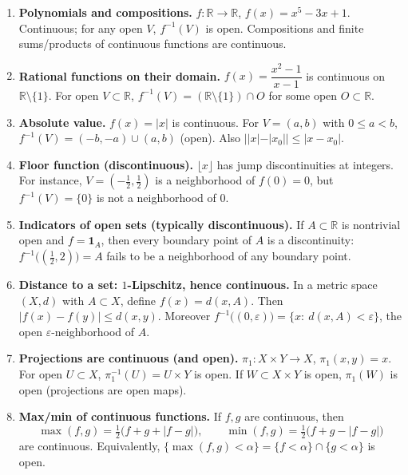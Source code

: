 \documentclass[12pt,a4paper]{article}
\begin{document}
\begin{enumerate}
	\item \textbf{Polynomials and compositions.}
	$f:\mathbb{R}\to\mathbb{R}$, $f(x)=x^5-3x+1$. Continuous; for any open $V$, $f^{-1}(V)$ is open.
	Compositions and finite sums/products of continuous functions are continuous.
	
	\item \textbf{Rational functions on their domain.}
	$f(x)=\dfrac{x^2-1}{x-1}$ is continuous on $\mathbb{R}\setminus\{1\}$. For open $V\subset\mathbb{R}$,
	$f^{-1}(V)=(\mathbb{R}\setminus\{1\})\cap O$ for some open $O\subset\mathbb{R}$.
	
	\item \textbf{Absolute value.}
	$f(x)=|x|$ is continuous. For $V=(a,b)$ with $0\le a<b$,
	$f^{-1}(V)=(-b,-a)\cup(a,b)$ (open). Also $||x|-|x_0||\le|x-x_0|$.
	
	\item \textbf{Floor function (discontinuous).}
	$\lfloor x\rfloor$ has jump discontinuities at integers. For instance, $V=(-\tfrac12,\tfrac12)$ is a neighborhood of $f(0)=0$, but $f^{-1}(V)=\{0\}$ is not a neighborhood of $0$.
	
	\item \textbf{Indicators of open sets (typically discontinuous).}
	If $A\subset\mathbb{R}$ is nontrivial open and $f=\mathbf{1}_A$, then every boundary point of $A$ is a discontinuity: $f^{-1}\big((\tfrac12,2)\big)=A$ fails to be a neighborhood of any boundary point.
	
	\item \textbf{Distance to a set: $1$-Lipschitz, hence continuous.}
	In a metric space $(X,d)$ with $A\subset X$, define $f(x)=d(x,A)$. Then
	$|f(x)-f(y)|\le d(x,y)$.
	Moreover $f^{-1}\big((0,\varepsilon)\big)=\{x:\ d(x,A)<\varepsilon\}$, the open $\varepsilon$-neighborhood of $A$.
	
	\item \textbf{Projections are continuous (and open).}
	$\pi_1:X\times Y\to X$, $\pi_1(x,y)=x$.
	For open $U\subset X$, $\pi_1^{-1}(U)=U\times Y$ is open.
	If $W\subset X\times Y$ is open, $\pi_1(W)$ is open (projections are open maps).
	
	\item \textbf{Max/min of continuous functions.}
	If $f,g$ are continuous, then
	\[
	\max(f,g)=\tfrac12\big(f+g+|f-g|\big),\qquad
	\min(f,g)=\tfrac12\big(f+g-|f-g|\big)
	\]
	are continuous. Equivalently, $\{\max(f,g)<\alpha\}=\{f<\alpha\}\cap\{g<\alpha\}$ is open.
	

\end{enumerate}
\end{document}
